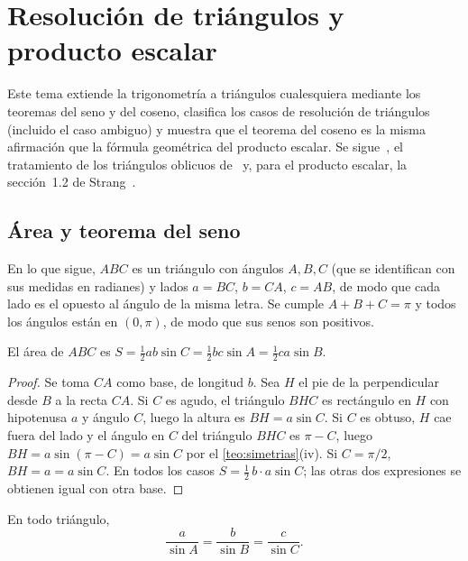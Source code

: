 \chapter{Resolución de triángulos y producto escalar}
\label{tema:3}

Este tema extiende la trigonometría a triángulos cualesquiera mediante los teoremas del seno y del coseno, clasifica los casos de resolución de triángulos (incluido el caso ambiguo) y muestra que el teorema del coseno es la misma afirmación que la fórmula geométrica del producto escalar. Se sigue~\cite[§10.1, §10.2 y §10.8]{osat}, el tratamiento de los triángulos oblicuos de~\cite{stewart} y, para el producto escalar, la sección~1.2 de Strang~\cite{strang}.

\section{Área y teorema del seno}

En lo que sigue, $ABC$ es un triángulo con ángulos $A,B,C$ (que se identifican con sus medidas en radianes) y lados $a=BC$, $b=CA$, $c=AB$, de modo que cada lado es el opuesto al ángulo de la misma letra. Se cumple $A+B+C=\pi$ y todos los ángulos están en $(0,\pi)$, de modo que sus senos son positivos.

\begin{proposicion}[Área]\label{prop:area}
El área de $ABC$ es $S=\tfrac12 ab\sin C=\tfrac12 bc\sin A=\tfrac12 ca\sin B$.
\end{proposicion}

\begin{proof}
Se toma $CA$ como base, de longitud $b$. Sea $H$ el pie de la perpendicular desde $B$ a la recta $CA$. Si $C$ es agudo, el triángulo $BHC$ es rectángulo en $H$ con hipotenusa $a$ y ángulo $C$, luego la altura es $BH=a\sin C$. Si $C$ es obtuso, $H$ cae fuera del lado y el ángulo en $C$ del triángulo $BHC$ es $\pi-C$, luego $BH=a\sin(\pi-C)=a\sin C$ por el \cref{teo:simetrias}(iv). Si $C=\pi/2$, $BH=a=a\sin C$. En todos los casos $S=\tfrac12\,b\cdot a\sin C$; las otras dos expresiones se obtienen igual con otra base.
\end{proof}

\begin{teorema}\label{teo:seno}
En todo triángulo,
\[
\frac{a}{\sin A}=\frac{b}{\sin B}=\frac{c}{\sin C}.
\]
\end{teorema}

